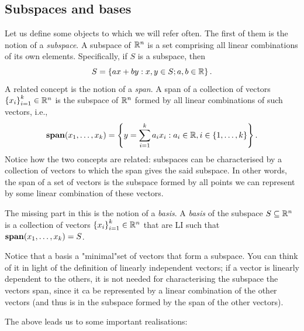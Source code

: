 \subsection{Subspaces and bases}

Let us define some objects to which we will refer often. The first of them is the notion of a \emph{subspace}. A subspace of $\mathbb{R}^n$ is a set comprising all linear combinations of its own elements. Specifically, if $S$ is a subspace, then
%
\begin{equation*}
	S = \left\{ ax + by : x,y \in S; a,b \in \mathbb{R} \right \}.
\end{equation*}
%
A related concept is the notion of a \emph{span}. A span of a collection of vectors $\left\{ x_i \right \}_{i=1}^k \in \mathbb{R}^n$ is the subspace of $\mathbb{R}^n$ formed by all linear combinations of such vectors, i.e., 
%
\begin{equation*}
	\mathop{\bf span}(x_1,\dots, x_k) = \left\{ y = \sum_{i=1}^k a_ix_i : a_i \in \mathbb{R}, i \in \left\{ 1,\dots, k \right \} \right \}. 
\end{equation*}
%
Notice how the two concepts are related: subspaces can be characterised by a collection of vectors to which the span gives the said subspace. In other words, the span of a set of vectors is the subspace formed by all points we can represent by some linear combination of these vectors. 

The missing part in this is the notion of a \emph{basis}. A \emph{basis} of the subspace $S \subseteq \mathbb{R}^n$ is a collection of vectors $\left\{ x_i \right \}_{i=1}^k \in \mathbb{R}^n$ that are LI such that $\mathop{\bf span}(x_1,\dots, x_k) = S$. 

Notice that a basis a "minimal"set of vectors that form a subspace. You can think of it in light of the definition of linearly independent vectors; if a vector is linearly dependent to the others, it is not needed for characterising the subspace the vectors span, since it ca be represented by a linear combination of the other vectors (and thus is in the subspace formed by the span of the other vectors).

The above leads us to some important realisations:


